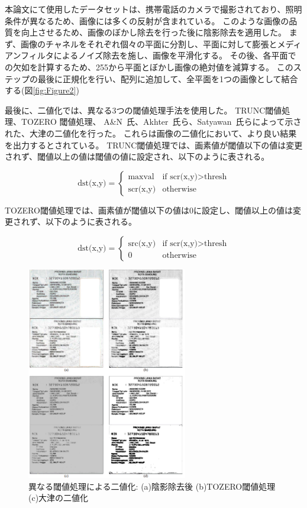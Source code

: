 \documentclass[uplatex, twocolumn,10pt]{jsarticle}
\begin{document}
本論文にて使用したデータセットは、携帯電話のカメラで撮影されており、照明条件が異なるため、画像には多くの反射が含まれている。
このような画像の品質を向上させるため、画像のぼかし除去を行った後に陰影除去を適用した。
まず、画像のチャネルをそれぞれ個々の平面に分割し、平面に対して膨張とメディアンフィルタによるノイズ除去を施し、画像を平滑化する。
その後、各平面での欠如を計算するため、255から平面とぼかし画像の絶対値を減算する。
このステップの最後に正規化を行い、配列に追加して、全平面を1つの画像として結合する(図\ref{fig:Figure2})

最後に、二値化では、異なる3つの閾値処理手法を使用した。
TRUNC閾値処理、TOZERO 閾値処理、 A\&N~\cite{bib12}氏、Akhter~\cite{bib5}氏ら、Satyawan~\cite{bib4}氏らによって示された、大津の二値化を行った。
これらは画像の二値化において、より良い結果を出力するとされている。
TRUNC閾値処理では、画素値が閾値以下の値は変更されず、閾値以上の値は閾値の値に設定され、以下のように表される。

\begin{equation}
    \text{dst(x,y)} =
    \left\{
    \begin{array}{ll}
        \text{maxval}   & \text{if scr(x,y)} > \text{thresh} \\
        \text{scr(x,y)} & \text{otherwise}
    \end{array}
    \right.
\end{equation}

TOZERO閾値処理では、画素値が閾値以下の値は0に設定し、閾値以上の値は変更されず、以下のように表される。

\begin{equation}
    \text{dst(x,y)} =
    \left\{
    \begin{array}{ll}
        \text{src(x,y)} & \text{if scr(x,y)} > \text{thresh} \\
        0               & \text{otherwise}
    \end{array}
    \right.
\end{equation}

\begin{figure}[t]
    \begin{center}
        \includegraphics*[width=7cm]{image/Figure3.png}
        \caption{異なる閾値処理による二値化: (a)陰影除去後 (b)TOZERO閾値処理 (c)大津の二値化}
        \label{fig:Figure3}
    \end{center}
\end{figure}
\end{document}
